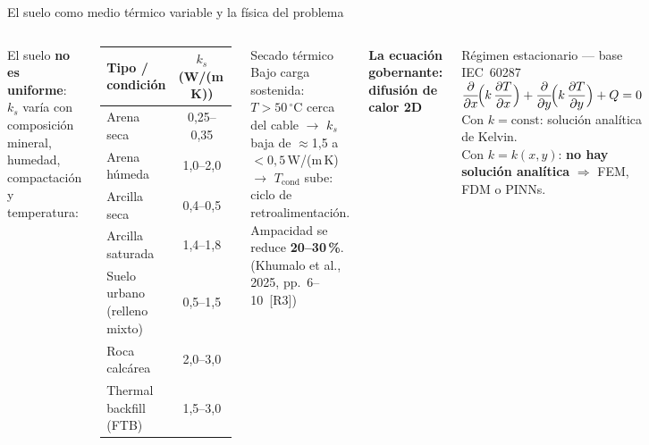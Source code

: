 \documentclass[aspectratio=169]{beamer}
\newcommand{\refcite}[1]{{\footnotesize\color{gray!70!black} #1}}
\begin{document}
\begin{frame}{El suelo como medio térmico variable y la física del problema}
\begin{columns}[T]
\justifying\scriptsize
El suelo \textbf{no es uniforme}: $k_s$ varía con composición mineral, humedad,
compactación y temperatura:

\begin{center}\scriptsize
\renewcommand{\arraystretch}{1.1}
\begin{tabular}{lc}
\toprule
\textbf{Tipo / condición}         & \textbf{$k_s$ (W/(m\,K))} \\
\midrule
Arena seca                         & 0{,}25--0{,}35 \\
Arena húmeda                       & 1{,}0--2{,}0   \\
Arcilla seca                       & 0{,}4--0{,}5   \\
Arcilla saturada                   & 1{,}4--1{,}8   \\
Suelo urbano (relleno mixto)       & 0{,}5--1{,}5   \\
Roca calcárea                      & 2{,}0--3{,}0   \\
Thermal backfill (FTB)             & 1{,}5--3{,}0   \\
\bottomrule
\end{tabular}
\end{center}

\vspace{0.1em}
\begin{alertblock}{\small Secado térmico}\scriptsize
Bajo carga sostenida: $T > 50\,^{\circ}$C cerca del cable $\to$
$k_s$ baja de $\approx$1{,}5 a $< 0{,}5$\,W/(m\,K)
$\to$ $T_\text{cond}$ sube: ciclo de retroalimentación.
Ampacidad se reduce \textbf{20--30\,\%}.
\refcite{(Khumalo et al., 2025, pp.~6--10~[R3])}
\end{alertblock}

\justifying\scriptsize
\textbf{La ecuación gobernante: difusión de calor 2D}

\begin{block}{\scriptsize Régimen estacionario --- base IEC~60287}
\centering\scriptsize
$\displaystyle
\frac{\partial}{\partial x}\!\Bigl(k\,\frac{\partial T}{\partial x}\Bigr)
+\frac{\partial}{\partial y}\!\Bigl(k\,\frac{\partial T}{\partial y}\Bigr)
+ Q = 0$\\[2pt]
\scriptsize\justifying
Con $k = \mathrm{const}$: solución analítica de Kelvin.\\
Con $k = k(x,y)$: \textbf{no hay solución analítica}
$\Rightarrow$ FEM, FDM o PINNs.
\end{block}


\end{columns}
\end{frame}
\end{document}
